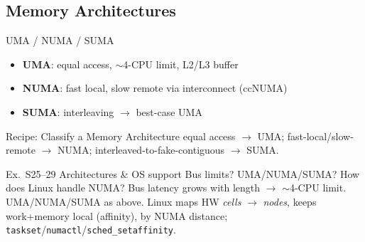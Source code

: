 \subsection{Memory Architectures}

\begin{definition}{UMA / NUMA / SUMA}
    \begin{itemize}
        \item \textbf{UMA}: equal access, $\sim$4-CPU limit, L2/L3 buffer
        \item \textbf{NUMA}: fast local, slow remote via interconnect (ccNUMA)
        \item \textbf{SUMA}: interleaving $\to$ best-case UMA
    \end{itemize}
\end{definition}

\begin{KR}{Recipe: Classify a Memory Architecture}
    equal access $\to$ UMA; fast-local/slow-remote $\to$ NUMA; interleaved-to-fake-contiguous $\to$ SUMA.
\end{KR}

\begin{example2}{Ex.\ S25--29 Architectures \& OS support}
    Bus limits? UMA/NUMA/SUMA? How does Linux handle NUMA?
    \tcblower
    Bus latency grows with length $\to$ $\sim$4-CPU limit. UMA/NUMA/SUMA as above. Linux maps HW \emph{cells} $\to$ \emph{nodes}, keeps work+memory local (affinity),  by NUMA distance; \texttt{taskset}/\texttt{numactl}/\texttt{sched\_setaffinity}.
\end{example2}
